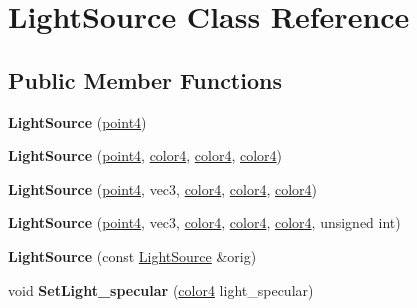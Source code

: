 \hypertarget{class_light_source}{\section{Light\-Source Class Reference}
\label{class_light_source}
}
\subsection*{Public Member Functions}
\begin{DoxyCompactItemize}
\item 
\hypertarget{class_light_source_a2b0f0cb0273a0028dbaa22857aaa3afb}{{\bfseries Light\-Source} (\hyperlink{struct_angel_1_1vec4}{point4})}\label{class_light_source_a2b0f0cb0273a0028dbaa22857aaa3afb}

\item 
\hypertarget{class_light_source_a9505e45e4d66ef7fcbe2c27e21891dde}{{\bfseries Light\-Source} (\hyperlink{struct_angel_1_1vec4}{point4}, \hyperlink{struct_angel_1_1vec4}{color4}, \hyperlink{struct_angel_1_1vec4}{color4}, \hyperlink{struct_angel_1_1vec4}{color4})}\label{class_light_source_a9505e45e4d66ef7fcbe2c27e21891dde}

\item 
\hypertarget{class_light_source_a3ba9ff99146ad0df1fc3ad501a95b1d0}{{\bfseries Light\-Source} (\hyperlink{struct_angel_1_1vec4}{point4}, vec3, \hyperlink{struct_angel_1_1vec4}{color4}, \hyperlink{struct_angel_1_1vec4}{color4}, \hyperlink{struct_angel_1_1vec4}{color4})}\label{class_light_source_a3ba9ff99146ad0df1fc3ad501a95b1d0}

\item 
\hypertarget{class_light_source_a422ea5fe583168e4ec742d71645863f2}{{\bfseries Light\-Source} (\hyperlink{struct_angel_1_1vec4}{point4}, vec3, \hyperlink{struct_angel_1_1vec4}{color4}, \hyperlink{struct_angel_1_1vec4}{color4}, \hyperlink{struct_angel_1_1vec4}{color4}, unsigned int)}\label{class_light_source_a422ea5fe583168e4ec742d71645863f2}

\item 
\hypertarget{class_light_source_a71dbbd92599046fb93fb1e7740088947}{{\bfseries Light\-Source} (const \hyperlink{class_light_source}{Light\-Source} \&orig)}\label{class_light_source_a71dbbd92599046fb93fb1e7740088947}

\item 
\hypertarget{class_light_source_a5f842c88b699493bcdb3d7e6ea379569}{void {\bfseries Set\-Light\-\_\-specular} (\hyperlink{struct_angel_1_1vec4}{color4} light\-\_\-specular)}\label{class_light_source_a5f842c88b699493bcdb3d7e6ea379569}


\end{DoxyCompactItemize}
